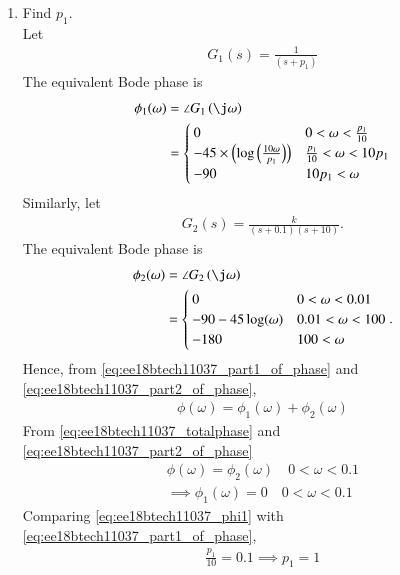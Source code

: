 \begin{enumerate}[label=\thesubsection.\arabic*.,ref=\thesubsection.\theenumi]
\item Find  $p_1$.
\\
\solution 
Let 
\begin{align}
\label{eq:ee18btech11037_g1}
G_1(s) = \frac{1}{(s+{p_1})}
\end{align}
%
The equivalent Bode phase is
\begin{align}
\begin{split}
\label{eq:ee18btech11037_part1_of_phase}
 \phi _1(\omega) &= \angle G_1\brak{\j\omega}
\\
&= 
 \begin{cases} 
        0 & 0<\omega< \frac{p_1}{10} \\
      -45\times\brak{\log\brak{\frac{10\omega}{p_1}}}& \frac{p_1}{10}<\omega<10p_1 \\
      -90 & 10p_1<\omega  
 \end{cases}
\end{split}
\end{align}
%
Similarly, let
\begin{align}
\label{eq:ee18btech11037_g2}
G_2(s) = \frac{k}{(s+0.1)(s+10)}.
\end{align}
%
The equivalent Bode phase is
%
\begin{align}
\label{eq:ee18btech11037_part2_of_phase}
\begin{split}
 \phi_2(\omega) &=  \angle G_2\brak{\j\omega}
\\
&=
 \begin{cases} 
        0 & 0<\omega<0.01 \\
      -90-45\log(\omega)& 0.01<\omega<100 \\
      -180 & 100<\omega  
 \end{cases}.
\end{split}
\end{align}
Hence, from  \eqref{eq:ee18btech11037_part1_of_phase} and \eqref{eq:ee18btech11037_part2_of_phase},
\begin{align}
\phi(\omega) = \phi_1(\omega) + \phi_2(\omega) 
\end{align} 
From \eqref{eq:ee18btech11037_totalphase} and \eqref{eq:ee18btech11037_part2_of_phase}
\begin{align}
\phi(\omega) = \phi_2(\omega)  \quad   0<\omega<0.1 \\
\label{eq:ee18btech11037_phi1}
\implies \phi_1(\omega) = 0 \quad  0<\omega<0.1 
\end{align}
Comparing \eqref{eq:ee18btech11037_phi1} with \eqref{eq:ee18btech11037_part1_of_phase},
\begin{align}
\frac{p_1}{10} = 0.1
\implies p_1 = 1
\end{align}


\end{enumerate}
